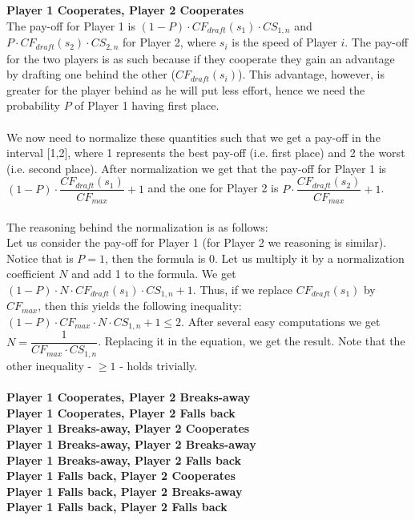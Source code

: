 \documentclass[10pt, a4paper]{report}
\begin{document}
\\\\
\textbf{Player 1 Cooperates, Player 2 Cooperates}
\\
The pay-off for Player 1 is $(1-P)\cdot CF_{draft}(s_1) \cdot CS_{1,n}$ and $P \cdot CF_{draft}(s_2) \cdot CS_{2,n}$ for Player 2, where $s_i$ is the speed of Player $i$. The pay-off for the two players is as such because if they cooperate they gain an advantage by drafting one behind the other ($CF_{draft}(s_i)$). This advantage, however, is greater for the player behind as he will put less effort, hence we need the probability $P$ of Player 1 having first place.
\\\\
We now need to normalize these quantities such that we get a pay-off in the interval [1,2], where 1 represents the best pay-off (i.e. first place) and 2 the worst (i.e. second place). After normalization we get that the pay-off for Player 1 is $(1-P)\cdot \dfrac{CF_{draft}(s_1)}{CF_{max}} + 1$ and the one for Player 2 is $P\cdot \dfrac{CF_{draft}(s_2)}{CF_{max}} + 1$. 
\\\\
The reasoning behind the normalization is as follows:\\
Let us consider the pay-off for Player 1 (for Player 2 we reasoning is similar). Notice that is $P=1$, then the formula is 0. Let us multiply it by a normalization coefficient $N$ and add 1 to the formula. We get $(1-P)\cdot N\cdot CF_{draft}(s_1) \cdot CS_{1,n} + 1$. Thus, if we replace $CF_{draft}(s_1)$ by $CF_{max}$, then this yields the following inequality: $(1-P)\cdot CF_{max} \cdot N \cdot CS_{1,n} + 1\le 2$. After several easy computations we get $N = \dfrac{1}{CF_{max}\cdot CS_{1,n}}$. Replacing it in the equation, we get the result. Note that the other inequality - $\ge 1$ - holds trivially.
\\\\
\textbf{Player 1 Cooperates, Player 2 Breaks-away}
\\
\textbf{Player 1 Cooperates, Player 2 Falls back}
\\
\textbf{Player 1 Breaks-away, Player 2 Cooperates}
\\
\textbf{Player 1 Breaks-away, Player 2 Breaks-away}
\\
\textbf{Player 1 Breaks-away, Player 2 Falls back}
\\
\textbf{Player 1 Falls back, Player 2 Cooperates}
\\
\textbf{Player 1 Falls back, Player 2 Breaks-away}
\\
\textbf{Player 1 Falls back, Player 2 Falls back}
\end{document}
